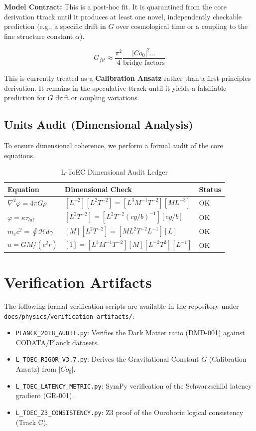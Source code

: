 \documentclass[11pt,titlepage]{article}
\begin{document}
\textbf{Model Contract:} This is a post-hoc fit. It is quarantined from the core derivation ttrack until it produces at least one novel, independently checkable prediction (e.g., a specific drift in $G$ over cosmological time or a coupling to the fine structure constant $\alpha$).

\begin{equation}
G_{fit} \approx \frac{\pi^2}{4} \frac{|Co_0|^2 \dots}{\text{bridge factors}}
\end{equation}

This is currently treated as a \textbf{Calibration Ansatz} rather than a first-principles derivation. It remains in the speculative ttrack until it yields a falsifiable prediction for $G$ drift or coupling variations.

\subsection{Units Audit (Dimensional Analysis)}
\label{sec:units_audit}
To ensure dimensional coherence, we perform a formal audit of the core equations.

\begin{table}[h!]
\centering
\begin{tabular}{@{}lll@{}}
\toprule
\textbf{Equation} & \textbf{Dimensional Check} & \textbf{Status} \\ \midrule
$\nabla^2 \varphi = 4\pi G \rho$ & $[L^{-2}][L^2 T^{-2}] = [L^3 M^{-1} T^{-2}][M L^{-3}]$ & OK \\
$\varphi = \kappa \tau_{lat}$ & $[L^2 T^{-2}] = [L^2 T^{-2} (cy/b)^{-1}][cy/b]$ & OK \\
$m_e c^2 = \oint \mathcal{H} d\gamma$ & $[M][L^2 T^{-2}] = [M L^2 T^{-2} L^{-1}][L]$ & OK \\
$u = GM/(c^2 r)$ & $[1] = [L^3 M^{-1} T^{-2}][M][L^{-2} T^2][L^{-1}]$ & OK \\ \bottomrule
\end{tabular}
\caption{L-ToEC Dimensional Audit Ledger}
\end{table}

\section{Verification Artifacts}
The following formal verification scripts are available in the repository under \texttt{docs/physics/verification\_artifacts/}:
\begin{itemize}
    
\item \texttt{PLANCK\_2018\_AUDIT.py}: Verifies the Dark Matter ratio (DMD-001) against CODATA/Planck datasets.
    
\item \texttt{L\_TOEC\_RIGOR\_V3.7.py}: Derives the Gravitational Constant $G$ (Calibration Ansatz) from $|Co_0|$.
    
\item \texttt{L\_TOEC\_LATENCY\_METRIC.py}: SymPy verification of the Schwarzschild latency gradient (GR-001).
    
\item \texttt{L\_TOEC\_Z3\_CONSISTENCY.py}: Z3 proof of the Ouroboric logical consistency (Track C).
\end{itemize}
\end{document}
